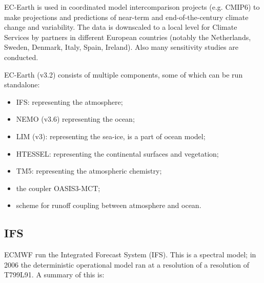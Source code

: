 EC-Earth is used in coordinated model intercomparison projects (e.g. CMIP6) to make projections and predictions 
of near-term and end-of-the-century climate change and variability. The data is downscaled to a local level for 
Climate Services by partners in different European countries (notably the Netherlands, Sweden, Denmark, Italy, Spain, 
Ireland). Also many sensitivity studies are conducted.


EC-Earth (v3.2) consists of multiple components, some of which can be run standalone:
\begin{itemize}
    \item IFS: representing the atmosphere;
    \item NEMO (v3.6) representing the ocean;
    \item LIM (v3): representing the sea-ice, is a part of ocean model;
    \item HTESSEL: representing the continental surfaces and vegetation;
    \item TM5: representing the atmospheric chemistry;
    \item the coupler OASIS3-MCT;
    \item scheme for runoff coupling between atmosphere and ocean.
\end{itemize}

\subsection{IFS}

\iffalse
ECMWF run the Integrated Forecast System (IFS). This is a spectral model; in 2006 the deterministic operational model ran at a resolution of 
a resolution of T799L91. A summary of this is:

